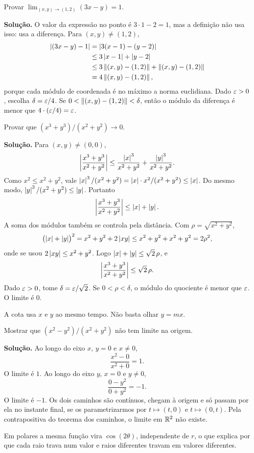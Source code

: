 \documentclass[11pt,a4paper]{article}
\begin{document}
\begin{exercicio}
Provar $\lim_{(x,y)\to(1,2)}(3x-y)=1$.

\textbf{Solução.}
O valor da expressão no ponto é $3\cdot 1-2=1$, mas a definição não usa isso: usa a diferença. Para $(x,y)\neq(1,2)$,
\begin{align*}
\left\lvert (3x-y)-1 \right\rvert
&=\left\lvert 3(x-1)-(y-2) \right\rvert\\
&\le 3\left\lvert x-1 \right\rvert+\left\lvert y-2 \right\rvert\\
&\le 3\left\lVert (x,y)-(1,2) \right\rVert+\left\lVert (x,y)-(1,2) \right\rVert\\
&=4\left\lVert (x,y)-(1,2) \right\rVert,
\end{align*}
porque cada módulo de coordenada é no máximo a norma euclidiana. Dado $\varepsilon>0$, escolha $\delta=\varepsilon/4$. Se $0<\left\lVert (x,y)-(1,2) \right\rVert<\delta$, então o módulo da diferença é menor que $4\cdot(\varepsilon/4)=\varepsilon$.
\end{exercicio}

\begin{exercicio}
Provar que $(x^3+y^3)/(x^2+y^2)\to 0$.

\textbf{Solução.}
Para $(x,y)\neq(0,0)$,
\[
\left\lvert \frac{x^3+y^3}{x^2+y^2} \right\rvert
\le\frac{\left\lvert x \right\rvert^3}{x^2+y^2}+\frac{\left\lvert y \right\rvert^3}{x^2+y^2}.
\]
Como $x^2\le x^2+y^2$, vale $\left\lvert x \right\rvert^3/(x^2+y^2)=\left\lvert x \right\rvert\cdot x^2/(x^2+y^2)\le\left\lvert x \right\rvert$. Do mesmo modo, $\left\lvert y \right\rvert^3/(x^2+y^2)\le\left\lvert y \right\rvert$. Portanto
\[
\left\lvert \frac{x^3+y^3}{x^2+y^2} \right\rvert\le\left\lvert x \right\rvert+\left\lvert y \right\rvert.
\]
A soma dos módulos também se controla pela distância. Com $\rho=\sqrt{x^2+y^2}$,
\[
\bigl(\left\lvert x \right\rvert+\left\lvert y \right\rvert\bigr)^2=x^2+y^2+2\left\lvert xy \right\rvert\le x^2+y^2+x^2+y^2=2\rho^2,
\]
onde se usou $2\left\lvert xy \right\rvert\le x^2+y^2$. Logo $\left\lvert x \right\rvert+\left\lvert y \right\rvert\le\sqrt{2}\,\rho$, e
\[
\left\lvert \frac{x^3+y^3}{x^2+y^2} \right\rvert\le\sqrt{2}\,\rho.
\]
Dado $\varepsilon>0$, tome $\delta=\varepsilon/\sqrt{2}$. Se $0<\rho<\delta$, o módulo do quociente é menor que $\varepsilon$. O limite é $0$.

A cota usa $x$ e $y$ ao mesmo tempo. Não basta olhar $y=mx$.
\end{exercicio}

\begin{exercicio}
Mostrar que $(x^2-y^2)/(x^2+y^2)$ não tem limite na origem.

\textbf{Solução.}
Ao longo do eixo $x$, $y=0$ e $x\neq 0$,
\[
\frac{x^2-0}{x^2+0}=1.
\]
O limite é $1$. Ao longo do eixo $y$, $x=0$ e $y\neq 0$,
\[
\frac{0-y^2}{0+y^2}=-1.
\]
O limite é $-1$. Os dois caminhos são contínuos, chegam à origem e só passam por ela no instante final, se os parametrizarmos por $t\mapsto(t,0)$ e $t\mapsto(0,t)$. Pela contrapositiva do teorema dos caminhos, o limite em $\mathbb{R}^2$ não existe.

Em polares a mesma função vira $\cos(2\theta)$, independente de $r$, o que explica por que cada raio trava num valor e raios diferentes travam em valores diferentes.
\end{exercicio}
\end{document}
